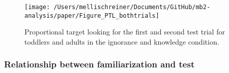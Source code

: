 \documentclass[
  man,floatsintext]{apa6}
\begin{document}
\begin{figure}

{\centering \texttt{[image: /Users/mellischreiner/Documents/GitHub/mb2-analysis/paper/Figure\_PTL\_bothtrials]} 

}

\caption{Proportional target looking for the first and second test trial for toddlers and adults in the ignorance and knowledge condition.}\label{fig:fig6}
\end{figure}

\subsubsection{Relationship between familiarization and test}\label{relationship-between-familiarization-and-test}
\end{document}
